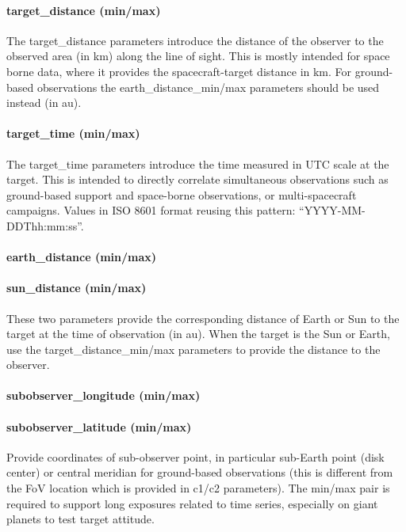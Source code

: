 \documentclass[11pt,a4paper]{ivoa}
\begin{document}
\paragraph{target\_distance (min/max)}

The target\_distance parameters introduce the distance of the observer to the observed area (in km) along the line of sight. This is mostly intended for space borne data, where it provides the spacecraft-target distance in km. For ground-based observations the earth\_distance\_min/max parameters should be used instead (in au).

\paragraph{target\_time (min/max)}

The target\_time parameters introduce the time measured in UTC scale at the target. This is intended to directly correlate simultaneous observations such as ground-based support and space-borne observations, or multi-spacecraft campaigns. Values in ISO 8601 format reusing this pattern: “YYYY-MM-DDThh:mm:ss”. 

\paragraph{earth\_distance (min/max)}

\paragraph{sun\_distance (min/max)}

These two parameters provide the corresponding distance of Earth or Sun to the target at the time of observation (in au). When the target is the Sun or Earth, use the target\_distance\_min/max parameters to provide the distance to the observer.

\paragraph{subobserver\_longitude (min/max)}

\paragraph{subobserver\_latitude (min/max)}

Provide coordinates of sub-observer point, in particular sub-Earth point (disk center) or central meridian for ground-based observations (this is different from the FoV location which is provided in c1/c2 parameters). The min/max pair is required to support long exposures related to time series, especially on giant planets to test target attitude.
\end{document}
